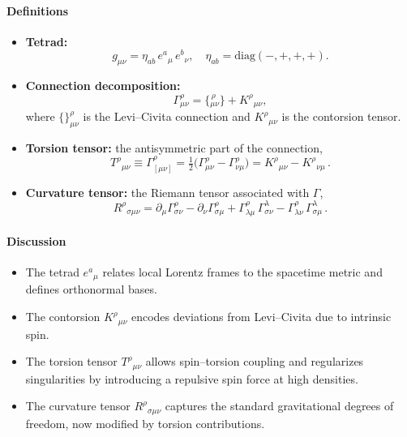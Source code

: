 \documentclass{article}
\begin{document}
\paragraph{Definitions}
\begin{itemize}
  \item \textbf{Tetrad:} 
    \[
      g_{\mu\nu} = \eta_{ab}\,e^a{}_\mu\,e^b{}_\nu,
      \quad
      \eta_{ab}=\mathrm{diag}(-,+,+,+).
    \]
  \item \textbf{Connection decomposition:}
    \[
      \Gamma^\rho_{\mu\nu}
      = \bigl\{\!^{\,\rho}_{\mu\nu}\bigr\}
      + K^\rho{}_{\mu\nu},
    \]
    where $\{\}^\rho_{\mu\nu}$ is the Levi–Civita connection and $K^\rho{}_{\mu\nu}$ is the contorsion tensor.
  \item \textbf{Torsion tensor:} the antisymmetric part of the connection,
    \[
       T^\rho{}_{\mu\nu} \equiv \Gamma^\rho_{[\mu\nu]}
       = \tfrac12\bigl(\Gamma^\rho_{\mu\nu}-\Gamma^\rho_{\nu\mu}\bigr)
       = K^\rho{}_{\mu\nu}-K^\rho{}_{\nu\mu}\,.
    \]



  
  \item \textbf{Curvature tensor:} the Riemann tensor associated with $\Gamma$,
    \[
      R^\rho{}_{\sigma\mu\nu}
      = \partial_\mu\Gamma^\rho_{\sigma\nu}
      - \partial_\nu\Gamma^\rho_{\sigma\mu}
      + \Gamma^\rho_{\lambda\mu}\,\Gamma^\lambda_{\sigma\nu}
      - \Gamma^\rho_{\lambda\nu}\,\Gamma^\lambda_{\sigma\mu}\,.
    \]
\end{itemize}

\paragraph{Discussion}
\begin{itemize}
  \item The tetrad $e^a{}_\mu$ relates local Lorentz frames to the spacetime metric and defines orthonormal bases.
  \item The contorsion $K^\rho{}_{\mu\nu}$ encodes deviations from Levi–Civita due to intrinsic spin.
  \item The torsion tensor $T^\rho{}_{\mu\nu}$ allows spin–torsion coupling and regularizes singularities by introducing a repulsive spin force at high densities.
  \item The curvature tensor $R^\rho{}_{\sigma\mu\nu}$ captures the standard gravitational degrees of freedom, now modified by torsion contributions.
\end{itemize}
\end{document}
